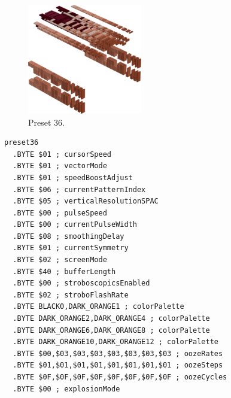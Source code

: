\clearpage
\begin{minipage}[b]{0.48\linewidth}
\begin{figure}[H]                                                          
  \centering                                                             
  \begin{adjustbox}{width=5cm,center}                                   
  \includegraphics[width=5cm]{src/colorspace_presets/preset36-45.png}%
  \end{adjustbox}                                                        
\caption*{Preset 36.}                                           
\end{figure}                                                               
\end{minipage}
\hspace{0.1cm}
\begin{minipage}[b]{0.48\linewidth}                            
\begin{lstlisting}[basicstyle=\ttfamily\tiny]
preset36
  .BYTE $01 ; cursorSpeed
  .BYTE $01 ; vectorMode
  .BYTE $01 ; speedBoostAdjust
  .BYTE $06 ; currentPatternIndex
  .BYTE $05 ; verticalResolutionSPAC
  .BYTE $00 ; pulseSpeed
  .BYTE $00 ; currentPulseWidth
  .BYTE $08 ; smoothingDelay
  .BYTE $01 ; currentSymmetry
  .BYTE $02 ; screenMode
  .BYTE $40 ; bufferLength
  .BYTE $00 ; stroboscopicsEnabled
  .BYTE $02 ; stroboFlashRate
  .BYTE BLACK0,DARK_ORANGE1 ; colorPalette
  .BYTE DARK_ORANGE2,DARK_ORANGE4 ; colorPalette
  .BYTE DARK_ORANGE6,DARK_ORANGE8 ; colorPalette
  .BYTE DARK_ORANGE10,DARK_ORANGE12 ; colorPalette
  .BYTE $00,$03,$03,$03,$03,$03,$03,$03 ; oozeRates
  .BYTE $01,$01,$01,$01,$01,$01,$01,$01 ; oozeSteps
  .BYTE $0F,$0F,$0F,$0F,$0F,$0F,$0F,$0F ; oozeCycles
  .BYTE $00 ; explosionMode
\end{lstlisting}
\end{minipage}

\vspace*{-0.5cm}


